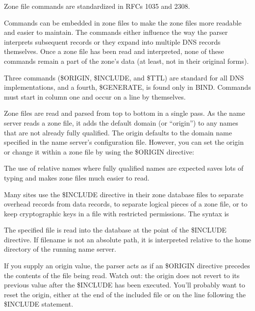 \leavevmode\hypertarget{part0024_split_020.htmlux5cux23_idContainer926}{}%
Zone file commands are standardized in RFCs 1035 and 2308.

Commands can be embedded in zone files to make the zone files more
readable and easier to maintain. The commands either influence the way
the parser interprets subsequent records or they expand into multiple
DNS records themselves. Once a zone file has been read and interpreted,
none of these commands remain a part of the zone's data (at least, not
in their original forms).

\protect\hypertarget{part0024_split_020.htmlux5cux23_idTextAnchor867}{}{}Three
commands ({\$ORIGIN}, {\$INCLUDE}, and {\$TTL}) are standard for all DNS
implementations, and a fourth, {\$GENERATE}, is found only in BIND.
Commands must start in column one and occur on a line by themselves.

Zone files are read and parsed from top to bottom in a single pass. As
the name server reads a zone file, it adds the default domain (or
``origin'') to any names that are not already fully qualified. The
origin defaults to the domain name specified in the name server's
configuration file. However, you can set the origin or change it within
a zone file by using
the\protect\hypertarget{part0024_split_020.htmlux5cux23_idIndexMarker2060}{}{}
{\$ORIGIN} directive:


The use of relative names where fully qualified names are expected saves
lots of typing and makes zone files much easier to read.

Many sites use the {\$INCLUDE} directive in their zone database files to
separate overhead records from data records, to separate logical pieces
of a zone file, or to keep cryptographic keys in a file with restricted
permissions. The syntax is


The specified file is read into the database at the point of the
\protect\hypertarget{part0024_split_020.htmlux5cux23_idIndexMarker2061}{}{}{\$INCLUDE}
directive. If {filename} is not an absolute path, it is interpreted
relative to the home directory of the running name server.

If you supply an {origin} value, the parser acts as if an {\$ORIGIN}
directive precedes the contents of the file being read. Watch out: the
origin does not revert to its previous value after the {\$INCLUDE} has
been executed. You'll probably want to reset the origin, either at the
end of the included file or on the line following the {\$INCLUDE}
statement.

